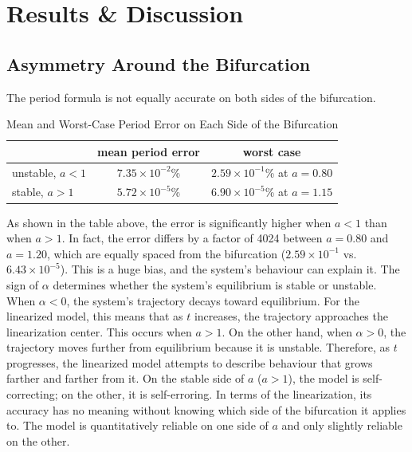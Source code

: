 \section{Results \& Discussion}\label{sec:results-discussion}
\subsection{Asymmetry Around the Bifurcation}\label{subsec:asymmetry}

    The period formula is not equally accurate on both sides of the bifurcation.

    \begin{table}[H]
        \centering
        \begin{tabular}{lcc}
            \toprule
            & \textbf{mean period error} & \textbf{worst case} \\
            \midrule
            unstable, $a<1$ & $7.35\times10^{-2}$\% & $2.59\times10^{-1}$\% at $a=0.80$ \\
            stable, $a>1$   & $5.72\times10^{-5}$\% & $6.90\times10^{-5}$\% at $a=1.15$ \\
            \bottomrule
        \end{tabular}
        \caption{Mean and Worst-Case Period Error on Each Side of the Bifurcation}
        \label{tab:asymmetry}
    \end{table}

    As shown in the table above, the error is significantly higher when $a<1$ than when $a>1$. In fact, the error differs by a factor of 4024 between $a=0.80$ and $a=1.20$, which are equally spaced from the bifurcation ($2.59\times10^{-1}$ vs. $6.43\times 10^{-5}$). This is a huge bias, and the system's behaviour can explain it. The sign of $\alpha$ determines whether the system's equilibrium is stable or unstable. When $\alpha<0$, the system's trajectory decays toward equilibrium. For the linearized model, this means that as $t$ increases, the trajectory approaches the linearization center. This occurs when $a>1$. On the other hand, when $\alpha>0$, the trajectory moves further from equilibrium because it is unstable. Therefore, as $t$ progresses, the linearized model attempts to describe behaviour that grows farther and farther from it. On the stable side of $a$ ($a>1$), the model is self-correcting; on the other, it is self-erroring. In terms of the linearization, its accuracy has no meaning without knowing which side of the bifurcation it applies to. The model is quantitatively reliable on one side of $a$ and only slightly reliable on the other.
    
